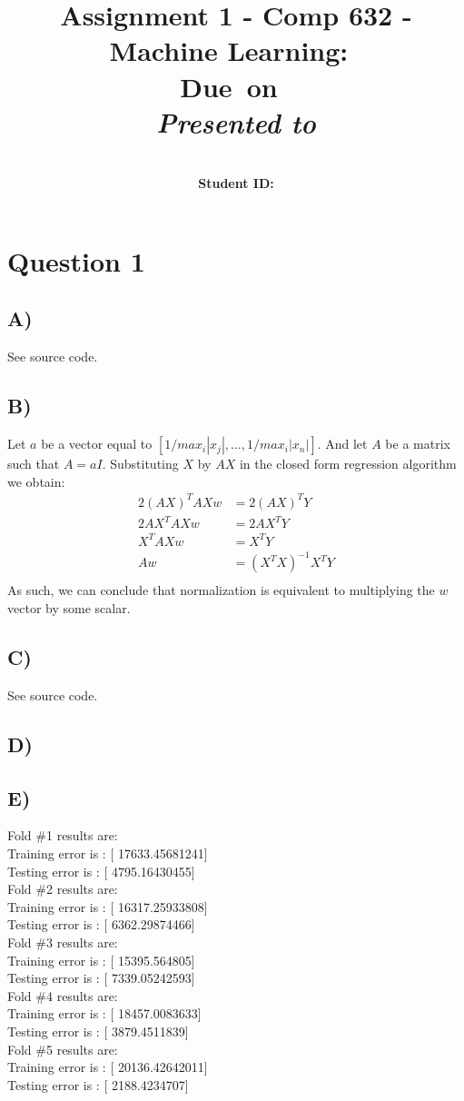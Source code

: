 \documentclass{report}
\title{Assignment 1 - Comp 632 - Machine Learning}
\title{\vspace{2in}\textmd{\textbf{\hmwkClass:\ \hmwkTitle}}\\
\normalsize\vspace{0.1in}\small{Due\ on\ \hmwkDueDate}\\
\vspace{0.1in}\large{\textit{Presented to \hmwkClassInstructor}}\vspace{3in}}
\date{}
\author{\textbf{\hmwkAuthorName}\\
    \textbf{Student ID: \hmwkAuthorNumber}}
\begin{document}
\maketitle
\section*{Question 1}
\subsection*{A)}
See source code.
\subsection*{B)}
Let $a$ be a vector equal to $[1/max_i |x_j|, ..., 1/max_i |x_n|]$. And let $A$
be a matrix such that $A=aI$. Substituting $X$ by $AX$ in the closed form regression
algorithm we obtain:
\begin{equation}
  \begin{aligned}
  2(AX)^TAXw &= 2(AX)^TY \\
  2AX^TAXw &= 2AX^TY \\
  X^TAXw &= X^TY \\
  Aw &= (X^TX)^{-1}X^TY \\
  \end{aligned}
\end{equation}
As such, we can conclude that normalization is equivalent to multiplying the $w$
vector by some scalar.
\subsection*{C)}
See source code.
\subsection*{D)}
\subsection*{E)}
Fold \#1 results are:\\
Training error is : [ 17633.45681241]\\
Testing error is : [ 4795.16430455]\\
Fold \#2 results are:\\
Training error is : [ 16317.25933808]\\
Testing error is : [ 6362.29874466]\\
Fold \#3 results are:\\
Training error is : [ 15395.564805]\\
Testing error is : [ 7339.05242593]\\
Fold \#4 results are:\\
Training error is : [ 18457.0083633]\\
Testing error is : [ 3879.4511839]\\
Fold \#5 results are:\\
Training error is : [ 20136.42642011]\\
Testing error is : [ 2188.4234707]\\
\end{document}
